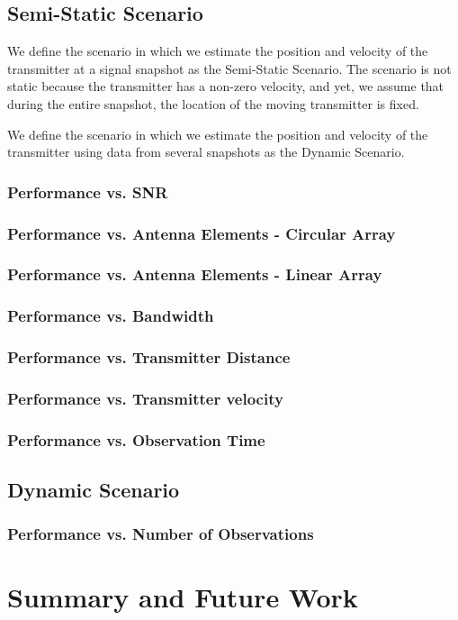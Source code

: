 \documentclass[10pt,a4paper]{report}
\begin{document}
\section{Semi-Static Scenario}
We define the scenario in which we estimate the position and velocity of the transmitter at a signal snapshot as the Semi-Static Scenario. The scenario is not static because the transmitter 
has a non-zero velocity, and yet, we assume that during the entire snapshot, the location
of the moving transmitter is fixed.

We define the scenario in which we estimate the position and velocity of the transmitter using data
from several snapshots as the Dynamic Scenario.

\subsection{Performance vs. SNR}
\subsection{Performance vs. Antenna Elements - Circular Array}
\subsection{Performance vs. Antenna Elements - Linear Array}
\subsection{Performance vs. Bandwidth}
\subsection{Performance vs. Transmitter Distance}
\subsection{Performance vs. Transmitter velocity}
\subsection{Performance vs. Observation Time}
\section{Dynamic Scenario}
\subsection{Performance vs. Number of Observations}
\cite{porat}
\chapter{Summary and Future Work}



\end{document}
